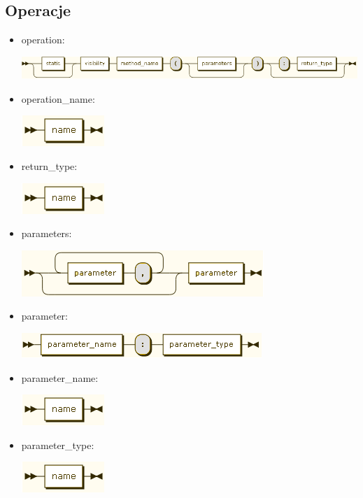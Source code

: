 \documentclass[a4paper,11pt,notitlepage]{article}
\begin{document}
\subsection{Operacje}
\begin{itemize}
\item operation:

\includegraphics[scale=0.66]{images/grammar/operation.png}

\item operation\_name:

\includegraphics[scale=0.66]{images/grammar/name_xx.png}

\item return\_type:

\includegraphics[scale=0.66]{images/grammar/name_xx.png}

\item parameters:

\includegraphics[scale=0.66]{images/grammar/parameters.png}

\item parameter:

\includegraphics[scale=0.66]{images/grammar/parameter.png}

\item parameter\_name:

\includegraphics[scale=0.66]{images/grammar/name_xx.png}

\item parameter\_type:

\includegraphics[scale=0.66]{images/grammar/name_xx.png}
\end{itemize}
\end{document}
